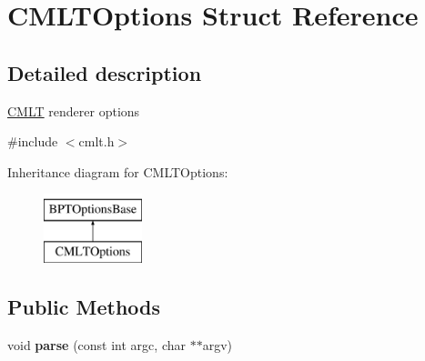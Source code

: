 \hypertarget{struct_c_m_l_t_options}{}\section{C\+M\+L\+T\+Options Struct Reference}
\label{struct_c_m_l_t_options}


\subsection{Detailed description}
\hyperlink{struct_c_m_l_t}{C\+M\+LT} renderer options 

{\ttfamily \#include $<$cmlt.\+h$>$}

Inheritance diagram for C\+M\+L\+T\+Options\+:\begin{figure}[H]
\begin{center}
\leavevmode
\includegraphics[height=2.000000cm]{struct_c_m_l_t_options}
\end{center}
\end{figure}
\subsection*{Public Methods}
\begin{DoxyCompactItemize}
\item 
\mbox{\label{struct_c_m_l_t_options_a5cb40524108fff96c81361387f566035}} 
void {\bfseries parse} (const int argc, char $\ast$$\ast$argv)
\end{DoxyCompactItemize}
